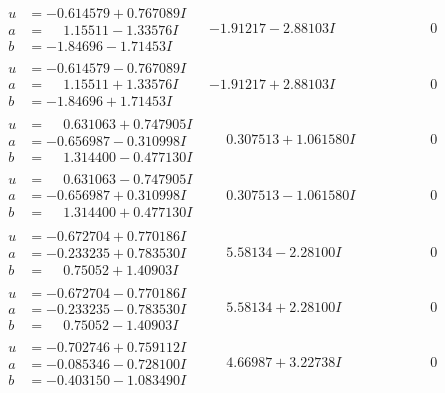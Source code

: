 \documentclass[1p]{elsarticle_modified}
\theoremstyle{definition}
\begin{document}
$$\begin{array}{c|c|c}
\begin{aligned}
u &= -0.614579 + 0.767089 I \\
a &= \phantom{-}1.15511 - 1.33576 I \\
b &= -1.84696 - 1.71453 I\end{aligned}
 & -1.91217 - 2.88103 I & \phantom{-0.000000 } 0 \\ \hline\begin{aligned}
u &= -0.614579 - 0.767089 I \\
a &= \phantom{-}1.15511 + 1.33576 I \\
b &= -1.84696 + 1.71453 I\end{aligned}
 & -1.91217 + 2.88103 I & \phantom{-0.000000 } 0 \\ \hline\begin{aligned}
u &= \phantom{-}0.631063 + 0.747905 I \\
a &= -0.656987 - 0.310998 I \\
b &= \phantom{-}1.314400 - 0.477130 I\end{aligned}
 & \phantom{-}0.307513 + 1.061580 I & \phantom{-0.000000 } 0 \\ \hline\begin{aligned}
u &= \phantom{-}0.631063 - 0.747905 I \\
a &= -0.656987 + 0.310998 I \\
b &= \phantom{-}1.314400 + 0.477130 I\end{aligned}
 & \phantom{-}0.307513 - 1.061580 I & \phantom{-0.000000 } 0 \\ \hline\begin{aligned}
u &= -0.672704 + 0.770186 I \\
a &= -0.233235 + 0.783530 I \\
b &= \phantom{-}0.75052 + 1.40903 I\end{aligned}
 & \phantom{-}5.58134 - 2.28100 I & \phantom{-0.000000 } 0 \\ \hline\begin{aligned}
u &= -0.672704 - 0.770186 I \\
a &= -0.233235 - 0.783530 I \\
b &= \phantom{-}0.75052 - 1.40903 I\end{aligned}
 & \phantom{-}5.58134 + 2.28100 I & \phantom{-0.000000 } 0 \\ \hline\begin{aligned}
u &= -0.702746 + 0.759112 I \\
a &= -0.085346 - 0.728100 I \\
b &= -0.403150 - 1.083490 I\end{aligned}
 & \phantom{-}4.66987 + 3.22738 I & \phantom{-0.000000 } 0 \\ \hline\begin{aligned}

\end{aligned}
\end{array}$$
\end{document}
